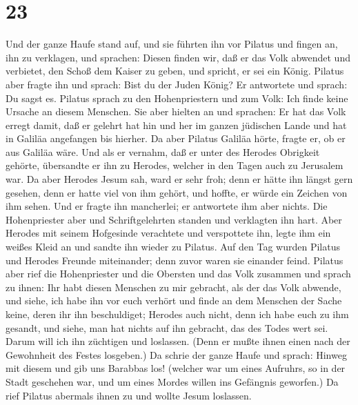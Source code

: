 \hypertarget{section-22}{%
\section{23}\label{section-22}}

 Und der ganze Haufe stand auf, und sie führten ihn vor
Pilatus  und fingen an, ihn zu verklagen, und sprachen:
Diesen finden wir, daß er das Volk abwendet und verbietet, den Schoß dem
Kaiser zu geben, und spricht, er sei ein König.  Pilatus
aber fragte ihn und sprach: Bist du der Juden König? Er antwortete und
sprach: Du sagst es.  Pilatus sprach zu den Hohenpriestern
und zum Volk: Ich finde keine Ursache an diesem Menschen. 
Sie aber hielten an und sprachen: Er hat das Volk erregt damit, daß er
gelehrt hat hin und her im ganzen jüdischen Lande und hat in Galiläa
angefangen bis hierher.  Da aber Pilatus Galiläa hörte,
fragte er, ob er aus Galiläa wäre.  Und als er vernahm, daß
er unter des Herodes Obrigkeit gehörte, übersandte er ihn zu Herodes,
welcher in den Tagen auch zu Jerusalem war.  Da aber Herodes
Jesum sah, ward er sehr froh; denn er hätte ihn längst gern gesehen,
denn er hatte viel von ihm gehört, und hoffte, er würde ein Zeichen von
ihm sehen.  Und er fragte ihn mancherlei; er antwortete ihm
aber nichts.  Die Hohenpriester aber und Schriftgelehrten
standen und verklagten ihn hart.  Aber Herodes mit seinem
Hofgesinde verachtete und verspottete ihn, legte ihm ein weißes Kleid an
und sandte ihn wieder zu Pilatus.  Auf den Tag wurden
Pilatus und Herodes Freunde miteinander; denn zuvor waren sie einander
feind.  Pilatus aber rief die Hohenpriester und die
Obersten und das Volk zusammen  und sprach zu ihnen: Ihr
habt diesen Menschen zu mir gebracht, als der das Volk abwende, und
siehe, ich habe ihn vor euch verhört und finde an dem Menschen der Sache
keine, deren ihr ihn beschuldiget;  Herodes auch nicht,
denn ich habe euch zu ihm gesandt, und siehe, man hat nichts auf ihn
gebracht, das des Todes wert sei.  Darum will ich ihn
züchtigen und loslassen.  (Denn er mußte ihnen einen nach
der Gewohnheit des Festes losgeben.)  Da schrie der ganze
Haufe und sprach: Hinweg mit diesem und gib uns Barabbas los!
 (welcher war um eines Aufruhrs, so in der Stadt geschehen
war, und um eines Mordes willen ins Gefängnis geworfen.) 
Da rief Pilatus abermals ihnen zu und wollte Jesum loslassen.

